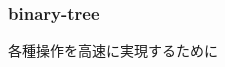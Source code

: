 \documentclass[main]{subfiles}
\begin{document}
\begin{frame}\frametitle{binary-tree}
各種操作を高速に実現するために
\end{frame}
\end{document}
